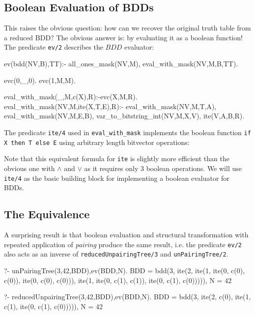 \documentclass[]{INCLUDES/llncs}
\begin{document}
\subsection{Boolean Evaluation of BDDs}
This raises the obvious question: how can we recover the original truth
table from a reduced BDD? The obvious answer is: by evaluating it as a
boolean function! The predicate {\tt ev/2} describes the $BDD$ evaluator:
\begin{code}
ev(bdd(NV,B),TT):-
  all_ones_mask(NV,M),
  eval_with_mask(NV,M,B,TT).

evc(0,_,0).
evc(1,M,M).

eval_with_mask(_,M,c(X),R):-evc(X,M,R).
eval_with_mask(NV,M,ite(X,T,E),R):-
  eval_with_mask(NV,M,T,A),
  eval_with_mask(NV,M,E,B),
  var_to_bitstring_int(NV,M,X,V),
  ite(V,A,B,R).
\end{code}
The predicate {\tt ite/4} used in {\tt eval\_with\_mask} 
implements the boolean function  {\tt if X then T else E}
using arbitrary length bitvector operations:
Note that this equivalent formula for {\tt ite} is slightly more
efficient than the obvious one with $\wedge$ and $\vee$ as it
requires only $3$ boolean operations. We will use {\tt ite/4} as the
basic building block for implementing a boolean evaluator for BDDs.

\subsection{The Equivalence} \label{equiv}
A surprising result
is that boolean evaluation and structural transformation with
repeated application of
{\em pairing}
produce the same result, i.e. 
the predicate {\tt ev/2} also acts as an inverse 
of {\tt reducedUnpairingTree/3} and {\tt unPairingTree/2}.


\begin{codex}
?- unPairingTree(3,42,BDD),ev(BDD,N).
BDD = bdd(3, 
        ite(2, 
            ite(1, 
                ite(0, c(0), c(0)), 
                ite(0, c(0), c(0))), 
            ite(1, 
                ite(0, c(1), c(1)), 
                ite(0, c(1), c(0))))),
N = 42

?- reducedUnpairingTree(3,42,BDD),ev(BDD,N).
BDD = bdd(3, 
         ite(2, 
            c(0), 
            ite(1, 
                c(1), 
                ite(0, c(1), c(0))))),
N = 42
\end{codex}
\end{document}
